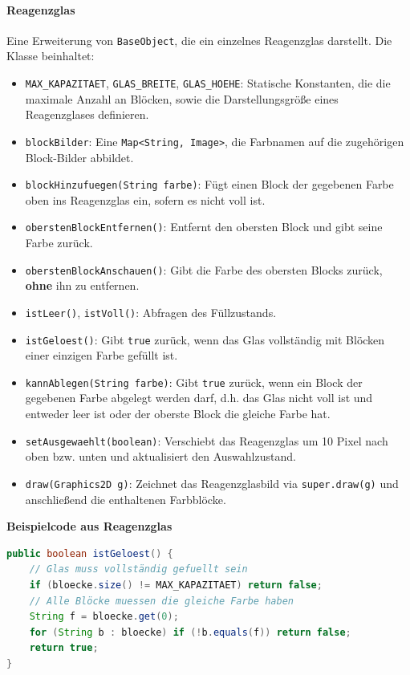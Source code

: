 \paragraph{Reagenzglas}
Eine Erweiterung von \texttt{BaseObject}, die ein einzelnes Reagenzglas darstellt.
Die Klasse beinhaltet:

\begin{sloppypar}
    \begin{itemize}
        \item \texttt{MAX\_KAPAZITAET}, \texttt{GLAS\_BREITE}, \texttt{GLAS\_HOEHE}: Statische Konstanten, die die maximale Anzahl an Blöcken, sowie die Darstellungsgröße eines Reagenzglases definieren.
        \item \texttt{blockBilder}: Eine \texttt{Map<String, Image>}, die Farbnamen auf die zugehörigen Block-Bilder abbildet.
        \item \texttt{blockHinzufuegen(String farbe)}: Fügt einen Block der gegebenen Farbe oben ins Reagenzglas ein, sofern es nicht voll ist.
        \item \texttt{oberstenBlockEntfernen()}: Entfernt den obersten Block und gibt seine Farbe zurück.
        \item \texttt{oberstenBlockAnschauen()}: Gibt die Farbe des obersten Blocks zurück, \textbf{ohne} ihn zu entfernen.
        \item \texttt{istLeer()}, \texttt{istVoll()}: Abfragen des Füllzustands.
        \item \texttt{istGeloest()}: Gibt \texttt{true} zurück, wenn das Glas vollständig mit Blöcken einer einzigen Farbe gefüllt ist.
        \item \texttt{kannAblegen(String farbe)}: Gibt \texttt{true} zurück, wenn ein Block der gegebenen Farbe abgelegt werden darf, d.h. das Glas nicht voll ist und entweder leer ist oder der oberste Block die gleiche Farbe hat.
        \item \texttt{setAusgewaehlt(boolean)}: Verschiebt das Reagenzglas um 10 Pixel nach oben bzw. unten und aktualisiert den Auswahlzustand.
        \item \texttt{draw(Graphics2D g)}: Zeichnet das Reagenzglasbild via \texttt{super.draw(g)} und anschließend die enthaltenen Farbblöcke.
    \end{itemize}
\end{sloppypar}

\textbf{Beispielcode aus Reagenzglas}
\begin{lstlisting}[caption=istGeloest-Methode, label=lst:mgistgeloest, captionpos=t, language=Java]
public boolean istGeloest() {
    // Glas muss vollständig gefuellt sein
    if (bloecke.size() != MAX_KAPAZITAET) return false;
    // Alle Blöcke muessen die gleiche Farbe haben
    String f = bloecke.get(0);
    for (String b : bloecke) if (!b.equals(f)) return false;
    return true;
}
\end{lstlisting}

